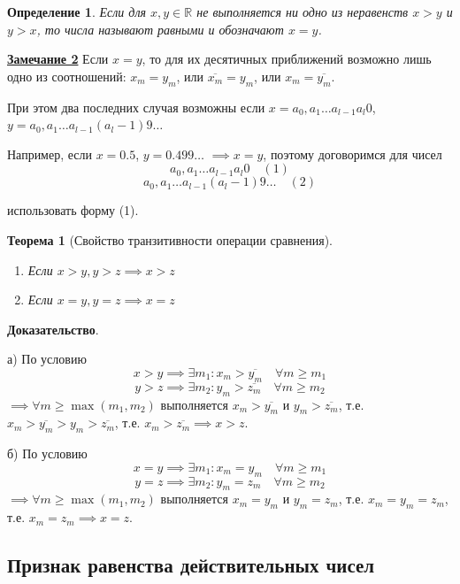 \documentclass{article}
\newcommand{\parspace}{\vspace{10pt}}
\theoremstyle{break}
\newtheorem{theorem}{Теорема}[subsection]
\newtheorem{definition}{Определение}[subsection]
\begin{document}
\begin{definition}
    Если для $x, y \in \mathbb{R}$ не выполняется ни одно из неравенств $x > y$ и $y > x$,
    то числа называют равными и обозначают $x = y$.
\end{definition}

\underline{\textbf{Замечание 2}}
Если $x = y$, то для их десятичных приближений возможно лишь одно из соотношений:
$x_m = y_m$, или $\overline{x_m} = y_m$, или $x_m = \overline{y_m}$.

При этом два последних случая возможны если $x = a_0,a_1 \dots a_{l-1}a_l0$,
$y = a_0,a_1 \dots a_{l-1}(a_l-1)9 \dots$ 

Например, если $x = 0.5$, $y = 0.499 \dots$ $\implies x = y$,
поэтому договоримся для чисел
\[a_0,a_1 \dots a_{l-1}a_l0 \quad (1)\]
\[a_0,a_1 \dots a_{l-1}(a_l-1)9 \dots \quad (2)\]

использовать форму (1).

\parspace

\begin{theorem}[Свойство транзитивности операции сравнения]
    \begin{enumerate}[label=\alph*)]
        \item Если $x > y, y > z \implies x > z$
        \item Если $x = y, y = z \implies x = z$
    \end{enumerate}
\end{theorem}

\textbf{Доказательство}.

а) По условию 
\[x > y \implies \exists m_1: x_m > \overline{y_m} \quad \forall m \ge m_1\]
\[y > z \implies \exists m_2: y_m > \overline{z_m} \quad \forall m \ge m_2\]
$\implies \forall m \ge \max (m_1, m_2)$ выполняется $x_m > \overline{y_m}$
и $y_m > \overline{z_m}$, т.е. $x_m > \overline{y_m} > y_m > \overline{z_m}$,
т.е. $x_m > \overline{z_m} \implies x > z$.

б) По условию 
\[x = y \implies \exists m_1: x_m = y_m \quad \forall m \ge m_1\]
\[y = z \implies \exists m_2: y_m = z_m \quad \forall m \ge m_2\]
$\implies \forall m \ge \max (m_1, m_2)$ выполняется $x_m = y_m$
и $y_m = z_m$, т.е. $x_m = y_m = z_m$,
т.е. $x_m = z_m \implies x = z$.

\pagebreak

\subsection{Признак равенства действительных чисел}
\end{document}
